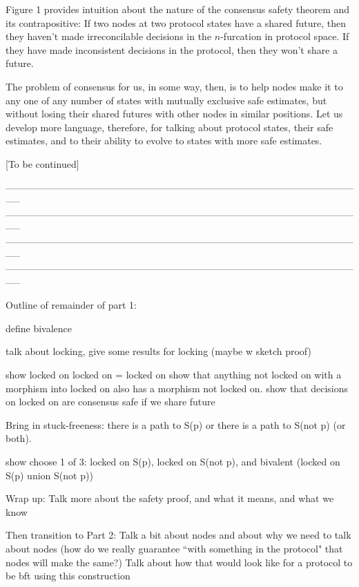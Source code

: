 \documentclass{article}
\theoremstyle{definition}
\begin{document}
Figure 1 provides intuition about the nature of the consensus safety theorem and its contrapositive: If two nodes at two protocol states have a shared future, then they haven't made irreconcilable decisions in the $n$-furcation in protocol space. If they have made inconsistent decisions in the protocol, then they won't share a future.

The problem of consensus for us, in some way, then, is to help nodes make it to any one of any number of states with mutually exclusive safe estimates, but without losing their shared futures with other nodes in similar positions. Let us develop more language, therefore, for talking about protocol states, their safe estimates, and to their ability to evolve to states with more safe estimates.

[To be continued]

\iffalse

-----------------------------------------------------------------------------------------------------------------
-----------------------------------------------------------------------------------------------------------------
-----------------------------------------------------------------------------------------------------------------
-----------------------------------------------------------------------------------------------------------------


Outline of remainder of part 1:

define bivalence 

talk about locking, give some results for locking (maybe w sketch proof)

show locked on locked on = locked on
show that anything not locked on with a morphism into locked on also has a morphism not locked on.
show that decisions on locked on are consensus safe if we share future

Bring in stuck-freeness:
  there is a path to S(p) or there is a path to S(not p) (or both).

show choose 1 of 3: locked on S(p), locked on S(not p), and bivalent (locked on S(p) union S(not p))

Wrap up:
Talk more about the safety proof, and what it means, and what we know

Then transition to Part 2:
Talk a bit about nodes and about why we need to talk about nodes (how do we really guarantee ``with something in the protocol" that nodes will make the same?)
Talk about how that would look like for a protocol to be bft using this construction
\end{document}
